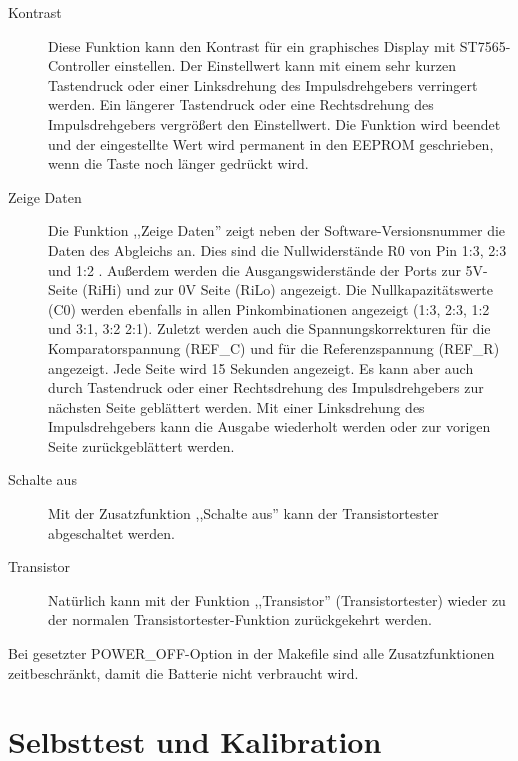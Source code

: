 \begin{description}
\item[Kontrast] 
Diese Funktion kann den Kontrast für ein graphisches Display mit ST7565-Controller einstellen.
Der Einstellwert kann mit einem sehr kurzen Tastendruck oder einer Linksdrehung des Impulsdrehgebers verringert werden.
Ein längerer Tastendruck oder eine Rechtsdrehung des Impulsdrehgebers vergrößert den Einstellwert.
Die Funktion wird beendet und der eingestellte Wert wird permanent in den EEPROM geschrieben, 
wenn die Taste noch länger gedrückt wird.

 \item[Zeige Daten]
Die Funktion ,,Zeige Daten'' zeigt neben der Software-Versionsnummer die Daten des Abgleichs an.
Dies sind die Nullwiderstände R0 von Pin 1:3, 2:3 und 1:2 .
Außerdem werden die Ausgangswiderstände der Ports zur 5V-Seite (RiHi) und 
zur 0V Seite (RiLo) angezeigt.
Die Nullkapazitätswerte (C0) werden ebenfalls in allen Pinkombinationen angezeigt (1:3, 2:3, 1:2 und 3:1, 3:2 2:1).
Zuletzt werden auch die Spannungskorrekturen für die Komparatorspannung (REF\_C) und für die Referenzspannung (REF\_R) angezeigt.
Jede Seite wird 15 Sekunden angezeigt.
Es kann aber auch durch Tastendruck oder einer Rechtsdrehung des Impulsdrehgebers
zur nächsten Seite geblättert werden.
Mit einer Linksdrehung des Impulsdrehgebers kann die Ausgabe wiederholt werden oder zur vorigen Seite zurückgeblättert werden.

 \item[Schalte aus]
Mit der Zusatzfunktion ,,Schalte aus'' kann der Transistortester abgeschaltet werden.\\

 \item[Transistor]
Natürlich kann mit der Funktion ,,Transistor'' (Transistortester) wieder zu der normalen Transistortester-Funktion
zurückgekehrt werden.

\end{description}

Bei gesetzter POWER\_OFF-Option in der Makefile sind alle Zusatzfunktionen zeitbeschränkt, damit die Batterie nicht verbraucht wird.

\section{Selbsttest und Kalibration}

